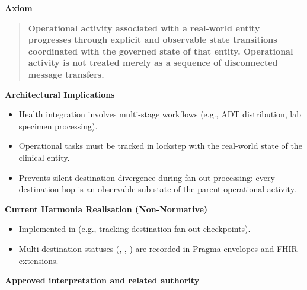 \par\medskip\textbf{Axiom}\par


\begin{quote}


\textbf{Operational activity associated with a real-world entity progresses through explicit and observable state transitions coordinated with the governed state of that entity. Operational activity is not treated merely as a sequence of disconnected message transfers.}



\end{quote}


\par\medskip\textbf{Architectural Implications}\par


\begin{itemize}


\item Health integration involves multi-stage workflows (e.g., ADT distribution, lab specimen processing).

\item Operational tasks must be tracked in lockstep with the real-world state of the clinical entity.

\item Prevents silent destination divergence during fan-out processing: every destination hop is an observable sub-state of the parent operational activity.

\end{itemize}


\par\medskip\textbf{Current Harmonia Realisation (Non-Normative)}\par


\begin{itemize}


\item Implemented in \texttt{} (e.g., \texttt{} tracking destination fan-out checkpoints).

\item Multi-destination statuses (\texttt{}, \texttt{}, \texttt{}) are recorded in Pragma envelopes and FHIR \texttt{} extensions.

\end{itemize}


\par\medskip\textbf{Approved interpretation and related authority}\par


